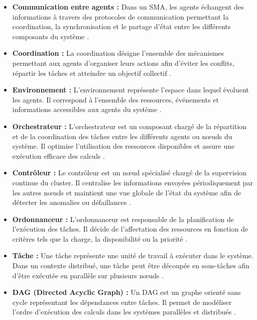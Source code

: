 \documentclass[12pt,a4paper]{report}
\begin{document}
\begin{itemize}
    \item[$\bullet$] \textbf{Communication entre agents :} Dans un SMA, les agents échangent des informations à travers des protocoles de communication permettant la coordination, la synchronisation et le partage d’état entre les différents composants du système \cite{ferber}.

    \item[$\bullet$] \textbf{Coordination :} La coordination désigne l’ensemble des mécanismes permettant aux agents d’organiser leurs actions afin d’éviter les conflits, répartir les tâches et atteindre un objectif collectif \cite{ferber}.

    \item[$\bullet$] \textbf{Environnement :} L’environnement représente l’espace dans lequel évoluent les agents. Il correspond à l’ensemble des ressources, événements et informations accessibles aux agents du système \cite{ferber}.

    \item[$\bullet$] \textbf{Orchestrateur :} L’orchestrateur est un composant chargé de la répartition et de la coordination des tâches entre les différents agents ou nœuds du système. Il optimise l’utilisation des ressources disponibles et assure une exécution efficace des calculs \cite{tanenbaum_ds, kubernetes}.

    \item[$\bullet$] \textbf{Contrôleur :} Le contrôleur est un nœud spécialisé chargé de la supervision continue du cluster. Il centralise les informations envoyées périodiquement par les autres nœuds et maintient une vue globale de l’état du système afin de détecter les anomalies ou défaillances \cite{tanenbaum_ds}.

    \item[$\bullet$] \textbf{Ordonnanceur :} L’ordonnanceur est responsable de la planification de l’exécution des tâches. Il décide de l’affectation des ressources en fonction de critères tels que la charge, la disponibilité ou la priorité \cite{topcuoglu}.

    \item[$\bullet$] \textbf{Tâche :} Une tâche représente une unité de travail à exécuter dans le système. Dans un contexte distribué, une tâche peut être découpée en sous-tâches afin d’être exécutée en parallèle sur plusieurs nœuds \cite{topcuoglu}.

    \item[$\bullet$] \textbf{DAG (Directed Acyclic Graph) :} Un DAG est un graphe orienté sans cycle représentant les dépendances entre tâches. Il permet de modéliser l’ordre d’exécution des calculs dans les systèmes parallèles et distribués \cite{topcuoglu}.


\end{itemize}
\end{document}
